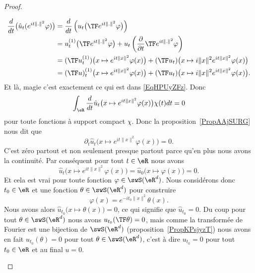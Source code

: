 \begin{proof}
\begin{subproof}
        \begin{subequations}    \label{EqCRGfbLU}
            \begin{align}
            \frac{ d }{ dt }\big( \hat u_t( e^{it\| . \|^2}\varphi) \big)&=\frac{ d }{ dt }\left( u_t\big( \TF e^{it\| . \|^2}\varphi \big) \right)\\
            &=u_t^{(1)}\big( \TF  e^{it\| . \|^2}\varphi \big)+u_t\left( \frac{ \partial  }{ \partial t }\TF e^{it\| . \|^2}\varphi \right)\\
            &=(\TF u_t^{(1)})\big( x\mapsto  e^{it\| x \|^2}\varphi(x) \big)+(\TF u_t)\big( x\mapsto i\| x \|^2 e^{it\| x \|^2}\varphi(x) \big)\\
            &=(\TF u)_t^{(1)}\big( x\mapsto  e^{it\| x \|^2}\varphi(x) \big)+(\TF u_t)\big( x\mapsto i\| x \|^2 e^{it\| x \|^2}\varphi(x) \big).
            \end{align}
        \end{subequations}
        Et là, magie c'est exactement ce qui est dans \eqref{EqHPUyZFz}. Donc
        \begin{equation}
            \int_{\eR}\frac{ d }{ dt }\hat u_t\big( x\mapsto  e^{it\| x \|^2}\varphi(x) \big)\chi(t)dt=0
        \end{equation}
        pour toute fonctions à support compact \( \chi\). Donc la proposition~\ref{PropAAjSURG} nous dit que
        \begin{equation}
            \partial_t\hat u_t\big( x\mapsto e^{it\| x \|^2}\varphi(x) \big)=0.
        \end{equation}
        C'est zéro partout et non seulement presque partout parce qu'en plus nous avons la continuité. Par conséquent pour tout \( t\in \eR\) nous avons
        \begin{equation}
            \hat u_t\big( x\mapsto e^{it\| x \|^2}\varphi(x) \big)=\hat u_0\big( x\mapsto \varphi(x)\big)=0.
        \end{equation}
        Et cela est vrai pour toute fonction \( \varphi\in\swS(\eR^d)\). Nous considérons donc \( t_0\in \eR\) et une fonction \( \theta\in\swS(\eR^d)\) pour construire
        \begin{equation}
            \varphi(x)= e^{-it_0\| x \|^2}\theta(x).
        \end{equation}
        Nous avons alors \( \hat u_{t_0}\big( x\mapsto\theta(x) \big)=0\), ce qui signifie que \( \hat u_{t_0}=0\). Du coup pour tout \( \theta\in\swS(\eR^d)\) nous avons \( u_{t_0}(\TF\theta)=0\), mais comme la transformée de Fourier est une bijection de \( \swS(\eR^d)\) (proposition~\ref{PropKPsjyzT}) nous avons en fait \( u_{t_0}(\theta)=0\) pour tout \( \theta\in\swS(\eR^d)\), c'est à dire \( u_{t_0}=0\) pour tout \( t_0\in \eR\) et au final \( u=0\).
    \end{subproof}
\end{proof}
